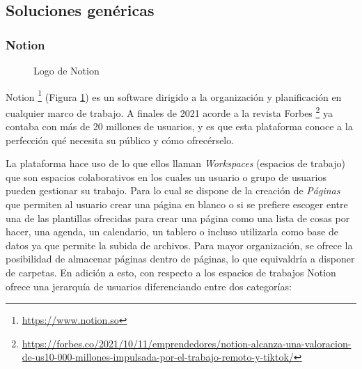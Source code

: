 \subsection{Soluciones genéricas}

\subsubsection*{Notion}
\begin{figure}[H]
    \caption{Logo de Notion}
    \label{fig:logo-notion}
\end{figure}

Notion \footnote{\url{https://www.notion.so}} (Figura \ref{fig:logo-notion}) es un software dirigido a la organización y planificación en cualquier marco de trabajo. A finales de 2021 acorde a la revista Forbes \footnote{\url{https://forbes.co/2021/10/11/emprendedores/notion-alcanza-una-valoracion-de-us10-000-millones-impulsada-por-el-trabajo-remoto-y-tiktok/}} ya contaba con más de 20 millones de usuarios, y es que esta plataforma conoce a la perfección qué necesita su público y cómo ofrecérselo. \bigskip

La plataforma hace uso de lo que ellos llaman \textit{Workspaces} \label{notion-workspaces} (espacios de trabajo) que son espacios colaborativos en los cuales un usuario o grupo de usuarios pueden gestionar su trabajo. Para lo cual se dispone de la creación de \textit{Páginas} que permiten al usuario crear una página en blanco o si se prefiere escoger entre una de las plantillas ofrecidas para crear una página como una lista de cosas por hacer, una agenda, un calendario, un tablero o incluso utilizarla como base de datos ya que permite la subida de archivos. Para mayor organización, se ofrece la posibilidad de almacenar páginas dentro de páginas, lo que equivaldría a disponer de carpetas. En adición a esto, con respecto a los espacios de trabajos Notion ofrece una jerarquía de usuarios diferenciando entre dos categorías:


